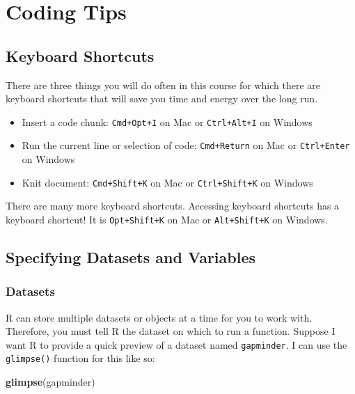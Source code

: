 \documentclass[
]{book}
\makeatletter
\newenvironment{Shaded}{\begin{snugshade}}{\end{snugshade}}
\newcommand{\FunctionTok}[1]{\textcolor[rgb]{0.27,0.27,0.27}{\textbf{#1}}}
\newcommand{\NormalTok}[1]{#1}
\providecommand{\tightlist}{%
  \setlength{\itemsep}{0pt}\setlength{\parskip}{0pt}}
\newenvironment{kframe}{%
\medskip{}
\setlength{\fboxsep}{.8em}
 \def\at@end@of@kframe{}%
 \ifinner\ifhmode%
  \def\at@end@of@kframe{\end{minipage}}%
  \begin{minipage}{\columnwidth}%
 \fi\fi%
 \def\FrameCommand##1{\hskip\@totalleftmargin \hskip-\fboxsep
 \colorbox{shadecolor}{##1}\hskip-\fboxsep
     \hskip-\linewidth \hskip-\@totalleftmargin \hskip\columnwidth}%
 \MakeFramed {\advance\hsize-\width
   \@totalleftmargin\z@ \linewidth\hsize
   \@setminipage}}%
 {\par\unskip\endMakeFramed%
 \at@end@of@kframe}
\renewenvironment{Shaded}{\begin{kframe}}{\end{kframe}}
\makeatother
\begin{document}
\hypertarget{appendix-appendix}{%
\appendix {}}


\hypertarget{coding-tips}{%
\chapter{Coding Tips}\label{coding-tips}}

\hypertarget{keyboard-shortcuts}{%
\section{Keyboard Shortcuts}\label{keyboard-shortcuts}}

There are three things you will do often in this course for which there are keyboard shortcuts that will save you time and energy over the long run.

\begin{itemize}
\tightlist
\item
  Insert a code chunk: \texttt{Cmd+Opt+I} on Mac or \texttt{Ctrl+Alt+I} on Windows
\item
  Run the current line or selection of code: \texttt{Cmd+Return} on Mac or \texttt{Ctrl+Enter} on Windows
\item
  Knit document: \texttt{Cmd+Shift+K} on Mac or \texttt{Ctrl+Shift+K} on Windows
\end{itemize}

There are many more keyboard shortcuts. Accessing keyboard shortcuts has a keyboard shortcut! It is \texttt{Opt+Shift+K} on Mac or \texttt{Alt+Shift+K} on Windows.

\hypertarget{specifying-datasets-and-variables}{%
\section{Specifying Datasets and Variables}\label{specifying-datasets-and-variables}}

\hypertarget{datasets}{%
\subsection{Datasets}\label{datasets}}

R can store multiple datasets or objects at a time for you to work with. Therefore, you must tell R the dataset on which to run a function. Suppose I want R to provide a quick preview of a dataset named \texttt{gapminder}. I can use the \texttt{glimpse()} function for this like so:

\begin{Shaded}
\begin{Highlighting}[]
\FunctionTok{glimpse}\NormalTok{(gapminder)}
\end{Highlighting}
\end{Shaded}
\end{document}
